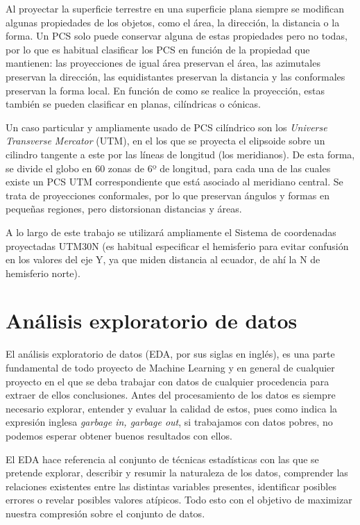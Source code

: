\documentclass[12pt,a4paper,]{book}
\numberwithin{dummy}{section}
\theoremstyle{ocrenumbox}
\theoremstyle{blacknumex}
\theoremstyle{blacknumbox}
\theoremstyle{ocrenum}
\theoremstyle{ocrenum}
\begin{document}
Al proyectar la superficie terrestre en una superficie plana siempre se
modifican algunas propiedades de los objetos, como el área, la
dirección, la distancia o la forma. Un PCS solo puede conservar alguna
de estas propiedades pero no todas, por lo que es habitual clasificar
los PCS en función de la propiedad que mantienen: las proyecciones de
igual área preservan el área, las azimutales preservan la dirección, las
equidistantes preservan la distancia y las conformales preservan la
forma local. En función de como se realice la proyección, estas también
se pueden clasificar en planas, cilíndricas o cónicas.

Un caso particular y ampliamente usado de PCS cilíndrico son los
\emph{Universe Transverse Mercator} (UTM), en el los que se proyecta el
elipsoide sobre un cilindro tangente a este por las líneas de longitud
(los meridianos). De esta forma, se divide el globo en 60 zonas de 6º de
longitud, para cada una de las cuales existe un PCS UTM correspondiente
que está asociado al meridiano central. Se trata de proyecciones
conformales, por lo que preservan ángulos y formas en pequeñas regiones,
pero distorsionan distancias y áreas.

A lo largo de este trabajo se utilizará ampliamente el Sistema de
coordenadas proyectadas UTM30N (es habitual especificar el hemisferio
para evitar confusión en los valores del eje Y, ya que miden distancia
al ecuador, de ahí la N de hemisferio norte).

\hypertarget{anuxe1lisis-exploratorio-de-datos}{%
\section{Análisis exploratorio de
datos}\label{anuxe1lisis-exploratorio-de-datos}}

El análisis exploratorio de datos (EDA, por sus siglas en inglés), es
una parte fundamental de todo proyecto de Machine Learning y en general
de cualquier proyecto en el que se deba trabajar con datos de cualquier
procedencia para extraer de ellos conclusiones. Antes del procesamiento
de los datos es siempre necesario explorar, entender y evaluar la
calidad de estos, pues como indica la expresión inglesa \emph{garbage
in, garbage out}, si trabajamos con datos pobres, no podemos esperar
obtener buenos resultados con ellos.

El EDA hace referencia al conjunto de técnicas estadísticas con las que
se pretende explorar, describir y resumir la naturaleza de los datos,
comprender las relaciones existentes entre las distintas variables
presentes, identificar posibles errores o revelar posibles valores
atípicos. Todo esto con el objetivo de maximizar nuestra compresión
sobre el conjunto de datos.
\end{document}
